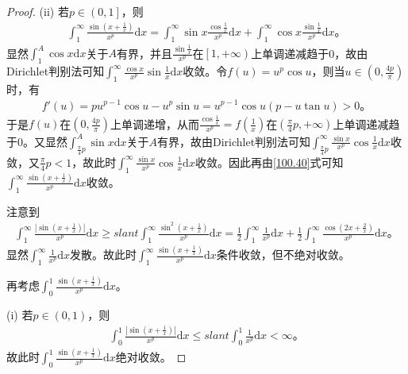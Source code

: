 \documentclass[../../main.tex]{subfiles}
\begin{document}
\begin{proof}
(ii) 若\(p\in \left( 0,1 \right]\)，则
\begin{align}
\int_1^{\infty}{\frac{\sin \left( x+\frac{1}{x} \right)}{x^p}\mathrm{d}x}=\int_1^{\infty}{\sin x\frac{\cos \frac{1}{x}}{x^p}\mathrm{d}x}+\int_1^{\infty}{\cos x\frac{\sin \frac{1}{x}}{x^p}\mathrm{d}x}。\label{100.40}
\end{align}
显然\(\int_1^A{\cos x\mathrm{d}x}\)关于\(A\)有界，并且\(\frac{\sin \frac{1}{x}}{x^p}\)在\(\left[ 1,+\infty \right)\)上单调递减趋于0，故由Dirichlet判别法可知\(\int_1^{\infty}{\frac{\cos x}{x^p}\sin \frac{1}{x}\mathrm{d}x}\)收敛。令\(f\left( u \right) =u^p\cos u\)，则当\(u\in \left( 0,\frac{4p}{\pi} \right)\)时，有
\begin{align*}
f'\left( u \right) =pu^{p-1}\cos u-u^p\sin u=u^{p-1}\cos u\left( p-u\tan u \right) >0。
\end{align*}
于是\(f\left( u \right)\)在\(\left( 0,\frac{4p}{\pi} \right)\)上单调递增，从而\(\frac{\cos \frac{1}{x}}{x^p}=f\left( \frac{1}{x} \right)\)在\(\left( \frac{\pi}{4}p,+\infty \right)\)上单调递减趋于0。又显然\(\int_{\frac{\pi}{4}p}^A{\sin x\mathrm{d}x}\)关于\(A\)有界，故由Dirichlet判别法可知\(\int_{\frac{\pi}{4}p}^{\infty}{\frac{\sin x}{x^p}\cos \frac{1}{x}\mathrm{d}x}\)收敛，又\(\frac{\pi}{4}p<1\)，故此时\(\int_1^{\infty}{\frac{\sin x}{x^p}\cos \frac{1}{x}\mathrm{d}x}\)收敛。因此再由\eqref{100.40}式可知\(\int_1^{\infty}{\frac{\sin \left( x+\frac{1}{x} \right)}{x^p}\mathrm{d}x}\)收敛。

注意到
\begin{align*}
\int_1^{\infty}{\frac{\left| \sin \left( x+\frac{1}{x} \right) \right|}{x^p}\mathrm{d}x}\geqslant slant \int_1^{\infty}{\frac{\sin ^2\left( x+\frac{1}{x} \right)}{x^p}\mathrm{d}x}
=\frac{1}{2}\int_1^{\infty}{\frac{1}{x^p}\mathrm{d}x}+\frac{1}{2}\int_1^{\infty}{\frac{\cos \left( 2x+\frac{2}{x} \right)}{x^p}\mathrm{d}x}。
\end{align*}
显然\(\int_1^{\infty}{\frac{1}{x^p}\mathrm{d}x}\)发散。故此时\(\int_1^{\infty}{\frac{\sin \left( x+\frac{1}{x} \right)}{x^p}\mathrm{d}x}\)条件收敛，但不绝对收敛。

再考虑\(\int_0^1{\frac{\sin \left( x+\frac{1}{x} \right)}{x^p}\mathrm{d}x}\)。

(i) 若\(p\in \left( 0,1 \right)\)，则
\begin{align*}
\int_0^1{\frac{\left| \sin \left( x+\frac{1}{x} \right) \right|}{x^p}\mathrm{d}x}\leqslant slant \int_0^1{\frac{1}{x^p}\mathrm{d}x}<\infty。
\end{align*}
故此时\(\int_0^1{\frac{\sin \left( x+\frac{1}{x} \right)}{x^p}\mathrm{d}x}\)绝对收敛。


\end{proof}
\end{document}

